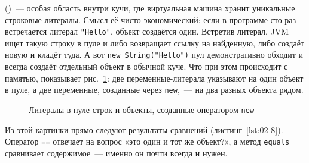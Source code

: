  ()~--- особая область внутри кучи, где
виртуальная машина хранит уникальные строковые литералы. Смысл её чисто
экономический: если в программе сто раз встречается литерал
\texttt{"Hello"}, объект создаётся один. Встретив литерал, JVM ищет такую
строку в пуле и либо возвращает ссылку на найденную, либо создаёт новую и
кладёт туда. А вот \texttt{new String("Hello")} пул демонстративно обходит и
всегда создаёт отдельный объект в обычной куче. Что при этом происходит с
памятью, показывает рис.~\ref{fig:02-5}: две переменные-литерала указывают на
один объект в пуле, а две переменные, созданные через \texttt{new},~--- на два
разных объекта рядом.

\begin{figure}[htbp]\centering
{}
\caption{Литералы в пуле строк и объекты, созданные оператором \texttt{new}}
\label{fig:02-5}
\end{figure}

Из этой картинки прямо следуют результаты сравнений
(листинг~\ref{lst:02-8}). Оператор \texttt{==} отвечает на вопрос «это один и
тот же объект?», а метод \texttt{equals} сравнивает содержимое~--- именно он
почти всегда и нужен.

